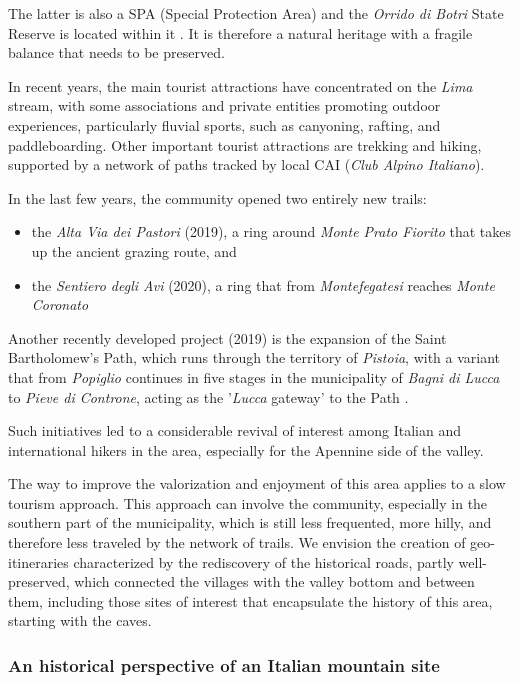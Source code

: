 \documentclass[sustainability,article,submit,pdftex,moreauthors]{Definitions/mdpi}
\begin{document}
The latter is also a SPA (Special Protection Area) and the \textit{Orrido di Botri} State Reserve is located within it . It is therefore a natural heritage with a fragile balance that needs to be preserved.

In recent years, the main tourist attractions have concentrated on the \emph{Lima} stream, with some associations and private entities promoting outdoor experiences, particularly fluvial sports, such as canyoning, rafting, and paddleboarding. Other important tourist attractions are trekking and hiking, supported by a network of paths tracked by local CAI (\textit{Club Alpino Italiano}).

In the last few years, the community opened two entirely new trails:
\begin{itemize}
	\item the \textit{Alta Via dei Pastori} (2019), a ring around \textit{Monte Prato Fiorito} that takes up the ancient grazing route, and
	\item the \textit{Sentiero degli Avi} (2020), a ring that from \textit{Montefegatesi}
	reaches \textit{Monte Coronato} \cite{pin21}
\end{itemize}

Another recently developed project (2019) is the expansion of the Saint Bartholomew's Path, which runs through the territory of \textit{Pistoia}, with a
variant that from \textit{Popiglio} continues in five stages in the municipality of \emph{Bagni di Lucca} to \textit{Pieve di Controne}, acting as the '\emph{Lucca} gateway' to the Path .

Such initiatives led to a considerable revival of interest among Italian and international hikers in the area, especially for the Apennine side of the valley.

The way to improve the valorization and enjoyment of this area applies to a slow tourism approach. This approach can involve the community, especially in the southern part of the municipality, which is still less frequented, more hilly, and therefore less traveled by the network of trails. We envision the creation of geo-itineraries characterized by the rediscovery of the historical roads, partly well-preserved, which connected the villages with the valley bottom and between them, including those sites of interest that encapsulate the history of this area, starting with the caves.

\subsubsection{An historical perspective of an Italian mountain site}
\end{document}
